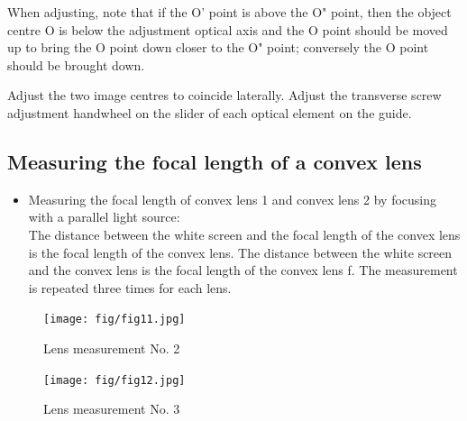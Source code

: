 \documentclass[UTF8]{article}
\begin{document}
    When adjusting, note that if the O' point is above the O" point, then the object centre O is below the adjustment optical axis and the O point should be moved up to bring the O point down closer to the O" point; conversely the O point should be brought down.
    
    Adjust the two image centres to coincide laterally. Adjust the transverse screw adjustment handwheel on the slider of each optical element on the guide.
    
    \subsection{Measuring the focal length of a convex lens}
    \begin{itemize}
    \item Measuring the focal length of convex lens 1 and convex lens 2 by focusing with a parallel light source: \\
    The distance between the white screen and the focal length of the convex lens is the focal length of the convex lens. The distance between the white screen and the convex lens is the focal length of the convex lens f. The measurement is repeated three times for each lens.
    \end{itemize}
    
    \begin{figure}[H]
          			\begin{minipage}[t]{0.5\linewidth}
          				\centering
          				\texttt{[image: fig/fig11.jpg]}
          				\caption{Lens measurement No. 2}
          				\label{figure.11}
          			\end{minipage}
          			\begin{minipage}[t]{0.5\linewidth}
          				\centering
          				\texttt{[image: fig/fig12.jpg]}
          				\caption{Lens measurement No. 3}
          				\label{figure.12}
          			\end{minipage}
          		\end{figure}
          		
\end{document}
